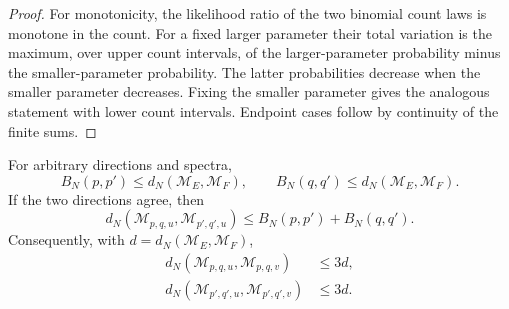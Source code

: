 \begin{proof}
For monotonicity, the likelihood ratio of the two binomial count
laws is monotone in the count.  For a fixed larger parameter their
total variation is the maximum, over upper count intervals, of the
larger-parameter probability minus the smaller-parameter probability.
The latter probabilities decrease when the smaller parameter
decreases.  Fixing the smaller parameter gives the analogous
statement with lower count intervals.  Endpoint cases follow by
continuity of the finite sums.
\end{proof}

\begin{lemma}
\label{lem:spectralprojection75}
For arbitrary directions and spectra,
\begin{equation}\label{eq:spectralprojection75}
 B_N(p,p')\le d_N(\mathcal M_E,\mathcal M_F),\qquad
 B_N(q,q')\le d_N(\mathcal M_E,\mathcal M_F).
\end{equation}
If the two directions agree, then
\begin{equation}\label{eq:alignedspectral75}
 d_N(\mathcal M_{p,q,u},\mathcal M_{p',q',u})
                              \le B_N(p,p')+B_N(q,q').
\end{equation}
Consequently, with $d=d_N(\mathcal M_E,\mathcal M_F)$,
\begin{equation}\label{eq:angularprojection75}
 \begin{split}
 d_N(\mathcal M_{p,q,u},\mathcal M_{p,q,v})&\le3d,\\
 d_N(\mathcal M_{p',q',u},\mathcal M_{p',q',v})&\le3d.
 \end{split}
\end{equation}
\end{lemma}
